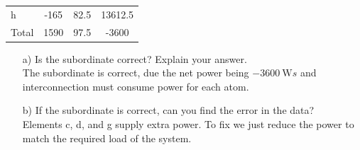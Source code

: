 \documentclass[a4paper]{article}
\begin{document}
\begin{itemize}
\begin{tabular}{l c c c}
	      	h       & -165                 & 82.5                   & 13612.5                                             \\
	      	Total   & 1590                 & 97.5                   & -3600                                               
	      \end{tabular}	  
	      \begin{itemize}
	      	\item[a)] Is the subordinate correct? Explain your answer. \\
	      	      The subordinate is correct, due the net power being $\SI{-3600}{\watt}s$ and interconnection must consume power for each atom.
	      	\item[b)] If the subordinate is correct, can you find the error in the data?  \\
	      	      Elements c, d, and g supply extra power. To fix we just reduce the power to match the required load of the system.
	      \end{itemize} 
	      	      	      	      	      	      	      	      	      	      	      	      	      	      	      	      	      	      	      	      	      	      	      	      	      	      	      	      	      	      	      
\end{itemize}

  
\end{document}
